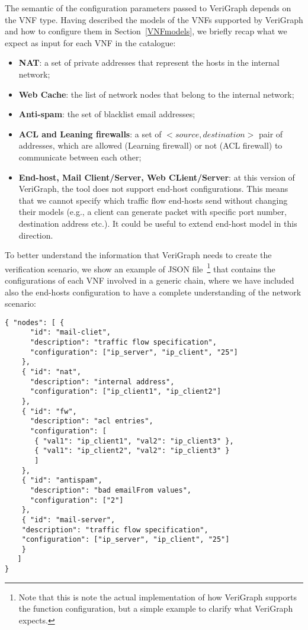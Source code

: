 The semantic of the configuration parameters passed to VeriGraph depends on the VNF type. Having described the models of the VNFs supported by VeriGraph and how to configure them in Section~\ref{VNFmodels}, we briefly recap what we expect as input for each VNF in the catalogue:
\begin{itemize}
	\item \textbf{NAT}: a set of private addresses that represent the hosts in the internal network; 
	\item \textbf{Web Cache}: the list of network nodes that belong to the internal network;
	\item \textbf{Anti-spam}: the set of blacklist email addresses;
	\item \textbf{ACL and Leaning firewalls}: a set of \textit{$<source, destination>$} pair of addresses, which are allowed (Learning firewall) or not (ACL firewall) to communicate between each other;
	\item \textbf{End-host, Mail Client/Server, Web CLient/Server}: at this version of VeriGraph, the tool does not support end-host configurations. This means that we cannot specify which traffic flow end-hosts send without changing their models (e.g., a client can generate packet with specific port number, destination address etc.). It could be useful to extend end-host model in this direction.
\end{itemize}

To better understand the information that VeriGraph needs to create the verification scenario, we show an example of JSON file~\footnote{Note that this is note the actual implementation of how VeriGraph supports the function configuration, but a simple example to clarify what VeriGraph expects.} that contains the configurations of each VNF involved in a generic chain, where we have included also the end-hosts configuration to have a complete understanding of the network scenario:\\

\begin{lstlisting}[firstnumber=1]
{ "nodes": [ {
      "id": "mail-cliet",
      "description": "traffic flow specification",
      "configuration": ["ip_server", "ip_client", "25"]
	},
    { "id": "nat",
      "description": "internal address",
      "configuration": ["ip_client1", "ip_client2"]
    },
    { "id": "fw",
      "description": "acl entries",
      "configuration": [
       { "val1": "ip_client1", "val2": "ip_client3" },
       { "val1": "ip_client2", "val2": "ip_client3" }
       ]
    },
    { "id": "antispam",
      "description": "bad emailFrom values",
      "configuration": ["2"]
    },
    { "id": "mail-server",
    "description": "traffic flow specification",
    "configuration": ["ip_server", "ip_client", "25"]
    }
   ]
}
\end{lstlisting}
